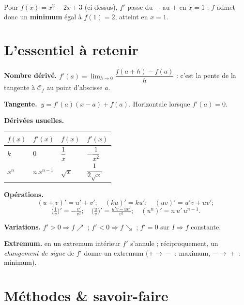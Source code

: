\begin{exemple}
Pour $f(x)=x^2-2x+3$ (ci-dessus), $f'$ passe du $-$ au $+$ en $x=1$ : $f$ admet donc
un \textbf{minimum} égal à $f(1)=2$, atteint en $x=1$.
\end{exemple}

\section{L'essentiel à retenir}

\begin{synthese}
\textbf{Nombre dérivé.} $f'(a)=\displaystyle\lim_{h\to 0}\dfrac{f(a+h)-f(a)}{h}$ :
c'est la pente de la tangente à $\mathcal{C}_f$ au point d'abscisse $a$.

\smallskip
\textbf{Tangente.} $\ y=f'(a)(x-a)+f(a)$. Horizontale lorsque $f'(a)=0$.

\smallskip
\textbf{Dérivées usuelles.}
\begin{center}\renewcommand{\arraystretch}{1.35}
\begin{tabular}{@{}l l l l@{}}
\toprule
$f(x)$ & $f'(x)$ & $f(x)$ & $f'(x)$ \\
\midrule
$k$    & $0$         & $\dfrac{1}{x}$  & $-\dfrac{1}{x^2}$ \\
$x^n$  & $n\,x^{n-1}$ & $\sqrt{x}$     & $\dfrac{1}{2\sqrt{x}}$ \\
\bottomrule
\end{tabular}
\end{center}

\smallskip
\textbf{Opérations.}
\[ (u+v)'=u'+v';\quad (ku)'=ku';\quad (uv)'=u'v+uv'; \]
\[ \Big(\tfrac1v\Big)'=-\tfrac{v'}{v^2};\quad \Big(\tfrac{u}{v}\Big)'=\tfrac{u'v-uv'}{v^2};
   \quad (u^n)'=n\,u'\,u^{n-1}. \]

\smallskip
\textbf{Variations.} $f'>0\Rightarrow f\nearrow$ ; $f'<0\Rightarrow f\searrow$ ;
$f'=0$ sur $I\Rightarrow f$ constante.

\smallskip
\textbf{Extremum.} en un extremum intérieur $f'$ s'annule ; réciproquement, un
\emph{changement de signe} de $f'$ donne un extremum ($+\!\to\!-$ : maximum,
$-\!\to\!+$ : minimum).
\end{synthese}

\section{Méthodes \& savoir-faire}

